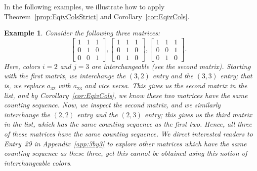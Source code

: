 \documentclass[12pt]{amsart}
\newtheorem{example}{Example}
\begin{document}
In the following examples, we illustrate how to apply Theorem~\ref{prop:EqivColsStrict} and Corollary~\ref{cor:EqivCols}.
\begin{example}
    Consider the following three matrices:
        \[\begin{bmatrix}
        1 & 1 & 1 \\
        0 & 1 & 0 \\
        0 & 0 & 1
        \end{bmatrix}, 
        \begin{bmatrix}
        1 & 1 & 1 \\
        0 & 1 & 0 \\
        0 & 1 & 0
        \end{bmatrix},
        \begin{bmatrix}
        1 & 1 & 1 \\
        0 & 0 & 1 \\
        0 & 1 & 0
        \end{bmatrix}.\]
    Here, colors $i = 2$ and $j = 3$ are interchangeable (see the second matrix).
    Starting with the first matrix, we interchange the $(3,2)$ entry and the $(3,3)$ entry; that is, we replace $a_{32}$ with $a_{23}$ and vice versa.
    This gives us the second matrix in the list, and by Corollary~\ref{cor:EqivCols}, we know these two matrices have the same counting sequence.
    Now, we inspect the second matrix, and we similarly interchange the $(2,2)$ entry and the $(2,3)$ entry; this gives us the third matrix in the list, which has the same counting sequence as the first two.
    Hence, all three of these matrices have the same counting sequence.
    We direct interested readers to Entry~29 in Appendix~\ref{app:3by3} to explore other matrices which have the same counting sequence as these three, yet this cannot be obtained using this notion of interchangeable colors.
\end{example}
\end{document}
